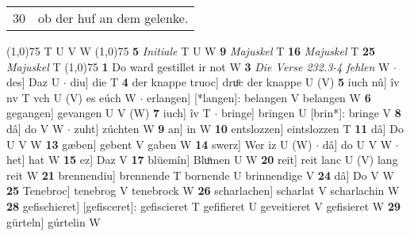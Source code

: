 \documentclass[8pt,a4paper,notitlepage]{article}
\begin{document}
\begin{table}[ht]
\begin{minipage}[t]{0.5\linewidth}
\begin{tabular}{rl}
30 & ob der huf an dem gelenke.\\ 
\end{tabular}
\scriptsize
\line(1,0){75} \newline
T U V W \newline
\line(1,0){75} \newline
\textbf{5} \textit{Initiale} T U W  \textbf{9} \textit{Majuskel} T  \textbf{16} \textit{Majuskel} T  \textbf{25} \textit{Majuskel} T  \newline
\line(1,0){75} \newline
\textbf{1} Do ward gestillet ir not W \textbf{3} \textit{Die Verse 232.3-4 fehlen} W   $\cdot$ des] Daz U  $\cdot$ diu] die T \textbf{4} der knappe truoc] druͦc der knappe U (V) \textbf{5} iuch nû] îv nv T vch U (V) es eúch W  $\cdot$ erlangen] [*langen]: belangen V belangen W \textbf{6} gegangen] gevangen U V (W) \textbf{7} iuch] îv T  $\cdot$ bringe] bringen U [brin*]: bringe V \textbf{8} dâ] do V W  $\cdot$ zuht] zúchten W \textbf{9} an] in W \textbf{10} entslozzen] eintslozzen T \textbf{11} dâ] Do U V W \textbf{13} gæben] gebent V gaben W \textbf{14} swerz] Wer iz U (W)  $\cdot$ dâ] do U V W  $\cdot$ het] hat W \textbf{15} ez] Daz V \textbf{17} blüemîn] Bluͦmen U W \textbf{20} reit] reit lanc U (V) lang reit W \textbf{21} brennendiu] brennende T bornende U brinnendige V \textbf{24} dâ] Do V W \textbf{25} Tenebroc] tenebrog V tenebrock W \textbf{26} scharlachen] scharlat V scharlachin W \textbf{28} gefischieret] [gefisceret]: gefiscieret T gefifieret U geveitieret V gefisieret W \textbf{29} gürteln] gúrtelin W \newline
\end{minipage}
\end{table}
\end{document}
